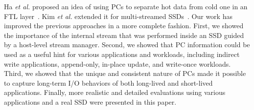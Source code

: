 Ha {\it et al.} proposed an idea of using PCs to separate hot data from cold
one in an FTL layer~\cite{PCHa}. 
Kim {\it et al.} extended it for multi-streamed
SSDs~\cite{PCStream}.  Our work has improved the previous approaches in a more
complete fashion. First, we showed the importance of the internal stream that
was performed inside an SSD guided by a host-level stream manager. Second, we
showed that PC information could be used as a useful hint for various
applications and workloads, including indirect write applications, append-only,
in-place update, and write-once workloads. Third, we showed that the unique and
consistent nature of PCs made it possible to capture long-term I/O behaviors of
both long-lived and short-lived applications.  Finally, more realistic and
detailed evaluations using various applications and a real SSD were presented
in this paper.


